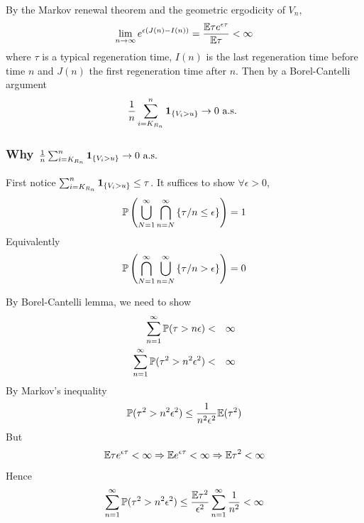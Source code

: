 \documentclass{beamer}
\begin{document}
\begin{frame}
  By the Markov renewal theorem and the geometric ergodicity of $V_n$,
  \[
  \lim_{n \to \infty} e^{\epsilon(J(n) - I(n))} = {
    \E \tau e^{\epsilon \tau}
    \over
    \E \tau
  }  < \infty
  \]
  where $\tau$ is a typical regeneration time, $I(n)$ is the last
  regeneration time before time $n$ and $J(n)$ the first regeneration
  time after $n$. Then by a Borel-Cantelli argument
  \[
  {1 \over n}\sum_{i=K_{R_n}}^n \1{V_i > u} \to 0 \text{ a.s. }
  \]
\end{frame}

\begin{frame}
  \frametitle{Why ${1 \over n} \sum_{i=K_{R_n}}^n \1{V_i > u} \to 0
    \text{ a.s. }$}
  First notice $ \sum_{i=K_{R_n}}^n \1{V_i > u} \leq \tau$.
  It suffices to show $\forall \epsilon > 0$,
  \[
  \P\left(
    \bigcup_{N=1}^\infty \bigcap_{n=N}^\infty \left\{
      \tau/n \leq \epsilon
      \right\}
  \right) = 1
  \]
  Equivalently
  \[
  \P\left(
    \bigcap_{N=1}^\infty \bigcup_{n=N}^\infty \left\{
      \tau/n > \epsilon
      \right\}
  \right) = 0
  \]
\end{frame}

\begin{frame}
  By Borel-Cantelli lemma, we need to show
  \begin{eqnarray*}
    \sum_{n=1}^\infty \P(\tau > n\epsilon) &<& \infty \\
    \sum_{n=1}^\infty \P(\tau^2 > n^2\epsilon^2) &<& \infty \\
  \end{eqnarray*}
  By Markov's inequality
  \[
  \P(\tau^2 > n^2\epsilon^2) \leq {1 \over n^2 \epsilon^2} \E(\tau^2)
  \]
  But
  \[
  \E \tau e^{\epsilon \tau} < \infty \Rightarrow
  \E e^{\epsilon \tau} < \infty \Rightarrow
  \E \tau^2 < \infty
  \]
  Hence
  \[
  \sum_{n=1}^\infty \P(\tau^2 > n^2\epsilon^2) \leq
  {
    \E \tau^2
    \over
    \epsilon^2
  }
\sum_{n=1}^\infty  {1 \over n^2} < \infty
  \]
\end{frame}



\end{document}
